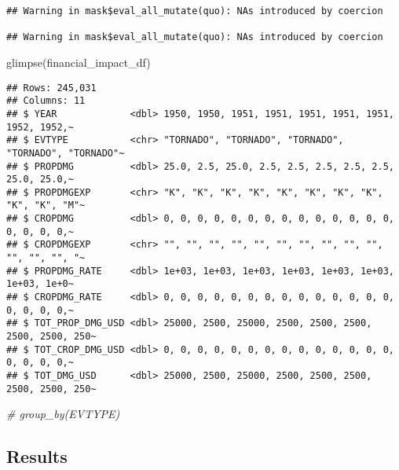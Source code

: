 \documentclass[
]{article}
\newenvironment{Shaded}{\begin{snugshade}}{\end{snugshade}}
\newcommand{\CommentTok}[1]{\textcolor[rgb]{0.56,0.35,0.01}{\textit{#1}}}
\newcommand{\FunctionTok}[1]{\textcolor[rgb]{0.00,0.00,0.00}{#1}}
\newcommand{\NormalTok}[1]{#1}
\begin{document}
\begin{verbatim}
## Warning in mask$eval_all_mutate(quo): NAs introduced by coercion

## Warning in mask$eval_all_mutate(quo): NAs introduced by coercion
\end{verbatim}

\begin{Shaded}
\begin{Highlighting}[]
\FunctionTok{glimpse}\NormalTok{(financial\_impact\_df)                                       }
\end{Highlighting}
\end{Shaded}

\begin{verbatim}
## Rows: 245,031
## Columns: 11
## $ YEAR             <dbl> 1950, 1950, 1951, 1951, 1951, 1951, 1951, 1952, 1952,~
## $ EVTYPE           <chr> "TORNADO", "TORNADO", "TORNADO", "TORNADO", "TORNADO"~
## $ PROPDMG          <dbl> 25.0, 2.5, 25.0, 2.5, 2.5, 2.5, 2.5, 2.5, 25.0, 25.0,~
## $ PROPDMGEXP       <chr> "K", "K", "K", "K", "K", "K", "K", "K", "K", "K", "M"~
## $ CROPDMG          <dbl> 0, 0, 0, 0, 0, 0, 0, 0, 0, 0, 0, 0, 0, 0, 0, 0, 0, 0,~
## $ CROPDMGEXP       <chr> "", "", "", "", "", "", "", "", "", "", "", "", "", "~
## $ PROPDMG_RATE     <dbl> 1e+03, 1e+03, 1e+03, 1e+03, 1e+03, 1e+03, 1e+03, 1e+0~
## $ CROPDMG_RATE     <dbl> 0, 0, 0, 0, 0, 0, 0, 0, 0, 0, 0, 0, 0, 0, 0, 0, 0, 0,~
## $ TOT_PROP_DMG_USD <dbl> 25000, 2500, 25000, 2500, 2500, 2500, 2500, 2500, 250~
## $ TOT_CROP_DMG_USD <dbl> 0, 0, 0, 0, 0, 0, 0, 0, 0, 0, 0, 0, 0, 0, 0, 0, 0, 0,~
## $ TOT_DMG_USD      <dbl> 25000, 2500, 25000, 2500, 2500, 2500, 2500, 2500, 250~
\end{verbatim}

\begin{Shaded}
\begin{Highlighting}[]
      \CommentTok{\# group\_by(EVTYPE)}
\end{Highlighting}
\end{Shaded}

\hypertarget{results}{%
\subsection{Results}\label{results}}
\end{document}
